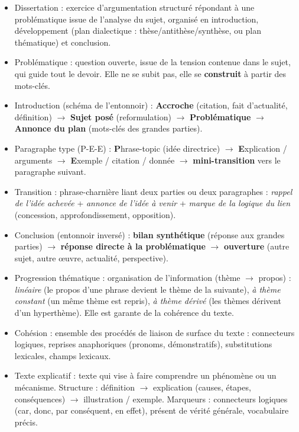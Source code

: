 \documentclass[11pt]{article}
\newcommand{\cle}[1]{{\popxbold\color{popdark}#1}}
\newcounter{popsec}
\newcounter{popsub}
\newcommand{\courssub}[1]{%
  \stepcounter{popsub}%
  \par\vspace{9pt}\noindent{\popxbold\fontsize{11.5}{13}\selectfont\color{popink}{\color{poporange}\thepopsec.\thepopsub}\hspace{6pt}#1}\par\nopagebreak\vspace{4pt}
}
\begin{document}
\courssub{Définitions clés}

\begin{itemize}
    \item \cle{Dissertation} : exercice d'argumentation structuré répondant à une \cle{problématique} issue de l'\cle{analyse du sujet}, organisé en \cle{introduction}, \cle{développement} (plan dialectique : thèse/antithèse/synthèse, ou plan thématique) et \cle{conclusion}.
    \item \cle{Problématique} : question ouverte, issue de la tension contenue dans le sujet, qui guide tout le devoir. Elle ne se subit pas, elle se \textbf{construit} à partir des mots-clés.
    \item \cle{Introduction} (schéma de l'entonnoir) : \textbf{Accroche} (citation, fait d'actualité, définition) $\rightarrow$ \textbf{Sujet posé} (reformulation) $\rightarrow$ \textbf{Problématique} $\rightarrow$ \textbf{Annonce du plan} (mots-clés des grandes parties).
    \item \cle{Paragraphe type (P-E-E)} : \textbf{P}hrase-topic (idée directrice) $\rightarrow$ \textbf{E}xplication / arguments $\rightarrow$ \textbf{E}xemple / citation / donnée $\rightarrow$ \textbf{mini-transition} vers le paragraphe suivant.
    \item \cle{Transition} : phrase-charnière liant deux parties ou deux paragraphes : \textit{rappel de l'idée achevée} + \textit{annonce de l'idée à venir} + \textit{marque de la logique du lien} (concession, approfondissement, opposition).
    \item \cle{Conclusion} (entonnoir inversé) : \textbf{bilan synthétique} (réponse aux grandes parties) $\rightarrow$ \textbf{réponse directe à la problématique} $\rightarrow$ \textbf{ouverture} (autre sujet, autre œuvre, actualité, perspective).
    \item \cle{Progression thématique} : organisation de l'information (thème $\rightarrow$ propos) : \textit{linéaire} (le propos d'une phrase devient le thème de la suivante), \textit{à thème constant} (un même thème est repris), \textit{à thème dérivé} (les thèmes dérivent d'un hyperthème). Elle est garante de la \cle{cohérence} du texte.
    \item \cle{Cohésion} : ensemble des procédés de liaison de surface du texte : connecteurs logiques, reprises anaphoriques (pronoms, démonstratifs), substitutions lexicales, champs lexicaux.
    \item \cle{Texte explicatif} : texte qui vise à faire comprendre un phénomène ou un mécanisme. Structure : définition $\rightarrow$ explication (causes, étapes, conséquences) $\rightarrow$ illustration / exemple. Marqueurs : connecteurs logiques (car, donc, par conséquent, en effet), présent de vérité générale, vocabulaire précis.
\end{itemize}
\end{document}
